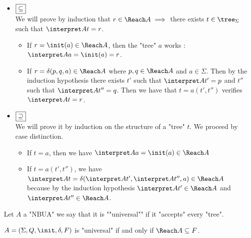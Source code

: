 \documentclass[twoside]{article}
\begin{document}
\begin{proofI}
	\begin{itemize}
		\item $\fbox{$\subseteq$}$\vspace{0.15cm}\\
		      We will prove by induction that $r \in \Reach A \implies$ there exists $t \in \tree_\Sigma$ such that
		      $\interpret A t = r$.

		      \begin{itemize}
			      \item If $r = \init(a) \in \Reach A$, then the "tree" $a$ works : $\interpret A a = \init (a) = r$.
			      \item If $r = \delta (p,q,a) \in \Reach A$ where $p,q \in \Reach A$ and $a \in \Sigma$. Then by the induction hypothesis
			            there exists $t'$ such that $\interpret A {t'} = p$ and $t''$ such that $\interpret A {t''} = q$.
			            Then we have that $t = a(t',t'')$ verifies $\interpret A t = r$.
		      \end{itemize}
		\item $\fbox{$\supseteq$}$\vspace{0.15cm}\\
		      We will prove it by induction on the structure of a "tree" $t$. We proceed by case distinction.
		      \begin{itemize}
			      \item If $t = a$, then we have $ \interpret A a = \init (a) \in \Reach A$
			      \item If $t = a(t',t'')$, we have $ \interpret A t = \delta(\interpret A {t'}, \interpret A {t''}, a) \in \Reach A$
			            because by the induction hypothesis $\interpret A {t'} \in \Reach A$  and $\interpret A {t''} \in \Reach A$.
		      \end{itemize}
	\end{itemize}
\end{proofI}

\begin{definition}
	Let $A $ a "NBUA" we say that it is ""universal"" if it "accepts" every "tree".
\end{definition}


\begin{theorem}
	$A = \DBUA$ is "universal" if and only if $\Reach A \subseteq F$.
\end{theorem}
\end{document}
